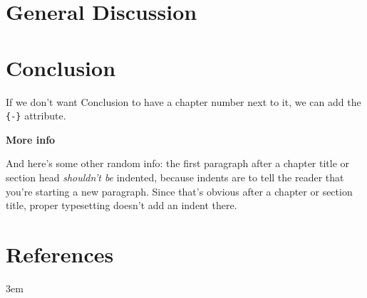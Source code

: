 \documentclass[twoside,10pt]{gihclass} %
\begin{document}
\hypertarget{general-discussion}{%
\chapter{General Discussion}\label{general-discussion}}

\hypertarget{conclusion}{%
\chapter*{Conclusion}\label{conclusion}}

If we don't want Conclusion to have a chapter number next to it, we can add the \texttt{\{-\}} attribute.

\textbf{More info}

And here's some other random info: the first paragraph after a chapter title or section head \emph{shouldn't be} indented, because indents are to tell the reader that you're starting a new paragraph. Since that's obvious after a chapter or section title, proper typesetting doesn't add an indent there.

\backmatter

\hypertarget{references}{%
\chapter*{References}\label{references}}

\twocolumn

\setlength{\parskip}{4pt}

\rightskip3em

\footnotesize
\end{document}

